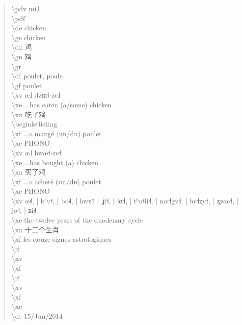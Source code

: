 \documentclass[a4paper,12pt]{article}
\newcommand{\ipa}[1]{{\phon #1}}
\newcommand{\zh}[1]{{\cn #1}}
\begin{document}
\begin{quote}
\textbackslash pdv \ipa{mi˩} \\
\textbackslash pdf \\
\textbackslash de chicken \\
\textbackslash ge chicken \\
\textbackslash dn \zh{鸡} \\
\textbackslash gn \zh{鸡} \\
\textbackslash gr \\
\textbackslash df poulet, poule \\
\textbackslash gf poulet \\
\textbackslash xv \ipa{æ˩ dzɯ˧-ze˩} \\
\textbackslash xe ...has eaten (a/some) chicken \\
\textbackslash xn \zh{吃了鸡} \\
\textbackslash begin{lstlisting} \\
\textbackslash xf ...a mangé (un/du) poulet \\
\textbackslash xc PHONO \\
\textbackslash xv \ipa{æ˩ hwæ˧-ze˧} \\
\textbackslash xe ...has bought (a) chicken \\
\textbackslash xn \zh{买了鸡} \\
\textbackslash xf ...a acheté (un/du) poulet \\
\textbackslash xc PHONO \\
\textbackslash xv \ipa{æ˩˥, | kʰv˧, | bo˩˥, | hwɤ˧˥, | ʝi˧, | lɑ˧, | tʰo˧li˧, | mv˧gv˧, | bv˧ʐv˧, | ʐwæ˧, | jo˧, | ʑi˩˥} \\
\textbackslash xe the twelve years of the duodenary cycle \\
\textbackslash xn \zh{十二个生肖} \\
\textbackslash xf les douze signes astrologiques \\
\textbackslash rf \\
\textbackslash xv \\
\textbackslash xf \\
\textbackslash rf \\
\textbackslash xv \\
\textbackslash xf \\
\textbackslash xc \\
\textbackslash dt 15/Jun/2014
\end{quote}

\pagebreak


\end{document}
